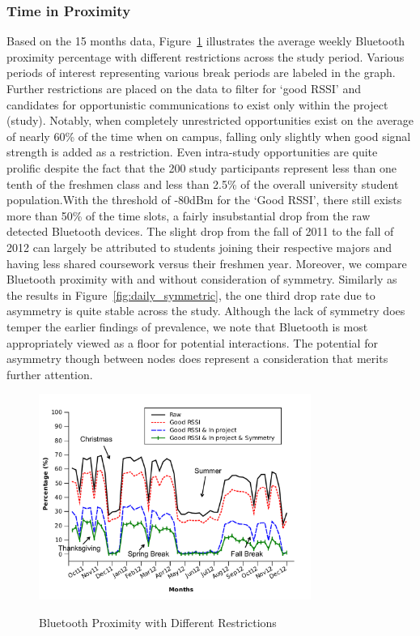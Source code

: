 \subsubsection{Time in Proximity}
Based on the 15 months data, Figure~\ref{fig:bluetooth} illustrates the average weekly Bluetooth proximity percentage with different restrictions across the study period.  Various periods of interest representing various break periods are labeled in the graph. Further restrictions are placed on the data to filter for `good RSSI' and candidates for opportunistic communications to exist only within the project (study).   Notably, when completely unrestricted opportunities exist on the average of nearly 60\% of the time when on campus, falling only slightly when good signal strength is added as a restriction.  Even intra-study opportunities are quite prolific despite the fact that the 200 study participants represent less than one tenth of the freshmen class and less than 2.5\% of the overall university student population.With the threshold of -80dBm for the `Good RSSI', there still exists more than 50\% of the time slots, a fairly insubstantial drop from the raw detected Bluetooth devices. The slight drop from the fall of 2011 to the fall of 2012 can largely be attributed to students joining their respective majors and having less shared coursework versus their freshmen year.  Moreover, we compare Bluetooth proximity with and without consideration of symmetry. Similarly as the results in Figure~\ref{fig:daily_symmetric}, the one third drop rate due to asymmetry is quite stable across the study.  Although the lack of symmetry does temper the earlier findings of prevalence, we note that Bluetooth is most appropriately viewed as a floor for potential interactions.  The potential for asymmetry though between nodes does represent a consideration that merits further attention.  

\begin{figure}[tbp]
\centering 
{\includegraphics[width=3.5in]{graphs/weekly_bluetooth_with_symmetry_tag.pdf}}
\caption{Bluetooth Proximity with Different Restrictions} 
\label{fig:bluetooth}
\end{figure} 

